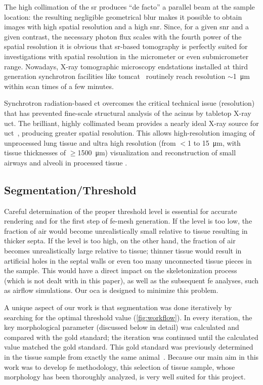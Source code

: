 The high collimation of the \ac{sr} produces ``de facto'' a parallel beam at the sample location: the resulting negligible geometrical blur makes it possible to obtain images with high spatial resolution and a high \ac{snr}. Since, for a given \ac{snr} and a given contrast, the necessary photon flux scales with the fourth power of the spatial resolution \cite{Bonse1996} it is obvious that \ac{sr}-based tomography is perfectly suited for investigations with spatial resolution in the micrometer or even submicrometer range. Nowadays, X-ray tomographic microscopy endstations installed at third generation synchrotron facilities like \ac{tomcat}~\cite{Stampanoni2007} routinely reach resolution $\sim$\SI{1}{\micro\meter} within scan times of a few minutes.

Synchrotron radiation-based \ac{ct} overcomes the critical technical issue (resolution) that has prevented fine-scale structural analysis of the acinus by tabletop X-ray \ac{uct}. The brilliant, highly collimated beam provides a nearly ideal X-ray source for \ac{uct}~\cite{Jorgensen1998}, producing greater spatial resolution. This allows high-resolution imaging of unprocessed lung tissue \cite{Bayat2006,Jheon2006,Monfraix2005,Sera2007,Sera2005} and ultra high resolution (from $<$1 to \SI{15}{\micro\meter}, with tissue thicknesses of $\geq$\SI{1500}{\micro\meter}) visualization and \threed reconstruction of small airways and alveoli in processed tissue \cite{Ikura2004,Schittny2008}.

\subsection{Segmentation/Threshold}
Careful determination of the proper threshold level is essential for accurate \threed rendering and for the first step of \ac{fe}-mesh generation. If the level is too low, the fraction of air would become unrealistically small relative to tissue resulting in thicker septa. If the level is too high, on the other hand, the fraction of air becomes unrealistically large relative to tissue; thinner tissue would result in artificial holes in the septal walls or even too many unconnected tissue pieces in the sample. This would have a direct impact on the skeletonization process (which is not dealt with in this paper), as well as the subsequent \ac{fe} analyses, such as airflow simulations. Our \ac{oca} is designed to minimize this problem.

A unique aspect of our work is that segmentation was done iteratively by searching for the optimal threshold value (\autoref{fig:workflow}). In every iteration, the key morphological parameter (discussed below in detail) was calculated and compared with the gold standard; the iteration was continued until the calculated value matched the gold standard. This gold standard was previously determined in the tissue sample from exactly the same animal~\cite{Tschanz2003}. Because our main aim in this work was to develop \ac{fe} methodology, this selection of tissue sample, whose morphology has been thoroughly analyzed, is very well suited for this project.

